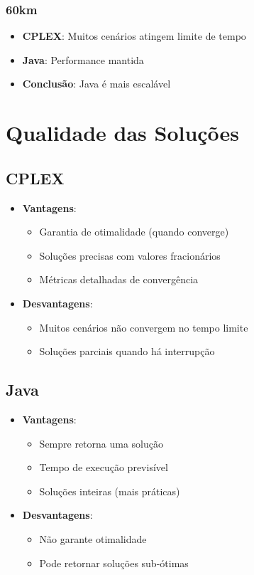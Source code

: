 \documentclass[12pt,a4paper]{article}
\begin{document}
\subsubsection{60km}

\begin{itemize}
    \item \textbf{CPLEX}: Muitos cenários atingem limite de tempo
    \item \textbf{Java}: Performance mantida
    \item \textbf{Conclusão}: Java é mais escalável
\end{itemize}

\section{Qualidade das Soluções}

\subsection{CPLEX}

\begin{itemize}
    \item \textbf{Vantagens}:
    \begin{itemize}
        \item Garantia de otimalidade (quando converge)
        \item Soluções precisas com valores fracionários
        \item Métricas detalhadas de convergência
    \end{itemize}
    \item \textbf{Desvantagens}:
    \begin{itemize}
        \item Muitos cenários não convergem no tempo limite
        \item Soluções parciais quando há interrupção
    \end{itemize}
\end{itemize}

\subsection{Java}

\begin{itemize}
    \item \textbf{Vantagens}:
    \begin{itemize}
        \item Sempre retorna uma solução
        \item Tempo de execução previsível
        \item Soluções inteiras (mais práticas)
    \end{itemize}
    \item \textbf{Desvantagens}:
    \begin{itemize}
        \item Não garante otimalidade
        \item Pode retornar soluções sub-ótimas
    \end{itemize}
\end{itemize}
\end{document}
